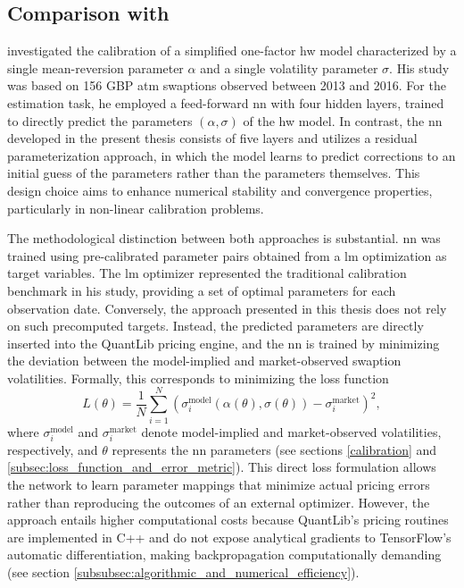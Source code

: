 \subsection{Comparison with \textcite{hernandez2016model}}
\textcite{hernandez2016model} investigated the calibration of a simplified one-factor \ac{hw} model characterized by a single mean-reversion parameter $\alpha$ and a single volatility parameter $\sigma$. His study was based on 156 GBP \ac{atm} swaptions observed between 2013 and 2016. For the estimation task, he employed a feed-forward \ac{nn} with four hidden layers, trained to directly predict the parameters $(\alpha, \sigma)$ of the \ac{hw} model. In contrast, the \ac{nn} developed in the present thesis consists of five layers and utilizes a residual parameterization approach, in which the model learns to predict corrections to an initial guess of the parameters rather than the parameters themselves. This design choice aims to enhance numerical stability and convergence properties, particularly in non-linear calibration problems.

The methodological distinction between both approaches is substantial. \textcite{hernandez2016model} \ac{nn} was trained using pre-calibrated parameter pairs obtained from a \ac{lm} optimization as target variables. The \ac{lm} optimizer represented the traditional calibration benchmark in his study, providing a set of optimal parameters for each observation date. Conversely, the approach presented in this thesis does not rely on such precomputed targets. Instead, the predicted parameters are directly inserted into the QuantLib pricing engine, and the \ac{nn} is trained by minimizing the deviation between the model-implied and market-observed swaption volatilities. Formally, this corresponds to minimizing the loss function
\[
	L(\theta) = \frac{1}{N} \sum_{i=1}^{N} \left( \sigma^{\text{model}}_i(\alpha(\theta), \sigma(\theta)) - \sigma^{\text{market}}_i \right)^2,
\]
where $\sigma^{\text{model}}_i$ and $\sigma^{\text{market}}_i$ denote model-implied and market-observed volatilities, respectively, and $\theta$ represents the \ac{nn} parameters (see sections \ref{calibration} and \ref{subsec:loss_function_and_error_metric}). This direct loss formulation allows the network to learn parameter mappings that minimize actual pricing errors rather than reproducing the outcomes of an external optimizer. However, the approach entails higher computational costs because QuantLib's pricing routines are implemented in C++ and do not expose analytical gradients to TensorFlow's automatic differentiation, making backpropagation computationally demanding (see section \ref{subsubsec:algorithmic_and_numerical_efficiency}).

